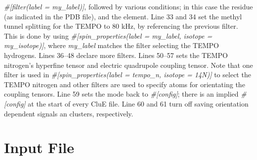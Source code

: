 \documentclass{book}
\begin{document}
\textit{\#[filter(label = my\_label)]}, 
followed by various conditions; 
in this case the residue (as indicated in the PDB file),
and the element.
Line 33 and 34 set the methyl tunnel splitting for the TEMPO to 80 kHz,
by referencing the previous filter.
This is done by using 
\textit{\#[spin\_properties(label = my\_label, isotope = my\_isotope)]},
where \textit{my\_label} matches the filter selecting the TEMPO
hydrogens.
Lines 36--48 declare more filters.
Lines 50--57 sets the TEMPO nitrogen's hyperfine tensor and 
electric quadrupole coupling tensor.
Note that one filter is used in 
\textit{\#[spin\_properties(label = tempo\_n, isotope = 14N)]}
to select the TEMPO nitrogen and other filters are used to specify atoms
for orientating the coupling tensors.
Line 59 sets the mode back to \textit{\#[config]}; there is an implied 
\textit{\#[config]} at the start of every CluE file.
Line 60 and 61 turn off saving orientation dependent signals an clusters,
respectively.
\section{Input File}
\end{document}
